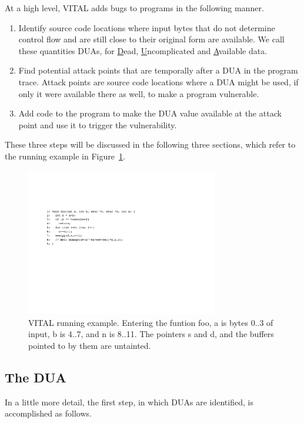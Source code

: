 
At a high level, VITAL adds bugs to programs in the following manner.

\begin {enumerate}
\item Identify source code locations where input bytes that do not determine control flow and are still close to their original form are available. 
We call these quantities DUAs, for \underline{D}ead, \underline{U}ncomplicated and \underline{A}vailable data. 
\item Find potential attack points that are temporally after a DUA in the program trace.
Attack points are source code locations where a DUA might be used, if only it were available there as well, to make a program vulnerable. 
\item Add code to the program to make the DUA value available at the attack point and use it to trigger the vulnerability. 
\end{enumerate}

These three steps will be discussed in the following three sections, which refer to the running example in Figure~\ref{fig:worked-example}.


\begin{figure} 
\centering
\includegraphics[width=3.3in]{worked-example2.pdf}
\caption{
VITAL running example.  
Entering the funtion foo, a is bytes 0..3 of input, b is 4..7, and n is 8..11.
The pointers s and d, and the buffers pointed to by them are untainted.  
}
\label{fig:worked-example}
\end{figure}



\subsection {The DUA}

In a little more detail, the first step, in which DUAs are identified, is accomplished as follows.  

